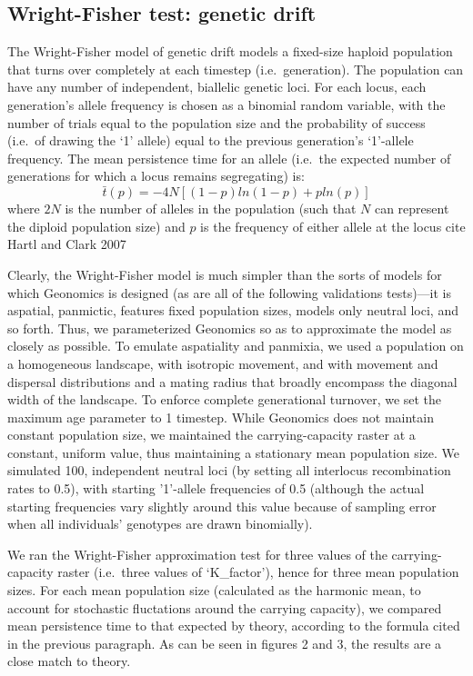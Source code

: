 ﻿\documentclass{article}
\begin{document}
\subsection{Wright-Fisher test: genetic drift}
The Wright-Fisher model of genetic drift models a fixed-size haploid population that
turns over completely at each timestep (i.e.\ generation).
The population can have any number of independent, biallelic genetic loci.
For each locus, each generation’s allele
frequency is chosen as a binomial random variable, with the number of trials equal to
the population size and the probability of success (i.e.\ of drawing the ‘1’ allele)
equal to the previous generation’s ‘1’-allele frequency.
The mean persistence time for an allele 
(i.e.\ the expected number of generations for which a locus remains segregating) 
is:
\begin{equation}
\bar{t}(p) = -4N[(1 - p)ln(1 - p) + pln(p)]
\end{equation}
where $2N$ is the number of alleles in the population (such that $N$ can
represent the diploid population size) and $p$ is the frequency of either allele
at the locus {\large cite Hartl and Clark 2007}

Clearly, the Wright-Fisher model is much simpler than the sorts of models for which
Geonomics is designed (as are all of the following validations tests)---it is aspatial,
panmictic, features fixed population sizes, models only neutral loci, and so forth. 
Thus, we parameterized Geonomics so as to approximate the model as closely as possible.
To emulate aspatiality and panmixia, we used a population on a homogeneous landscape,
with isotropic movement, and with movement and dispersal distributions
and a mating radius that broadly encompass the diagonal width of the landscape.
To enforce complete generational turnover, we set the
maximum age parameter to 1 timestep. While Geonomics does not maintain constant population
size, we maintained the carrying-capacity raster at a constant, uniform value, thus
maintaining a stationary mean population size. We simulated 100, independent neutral
loci (by setting all interlocus recombination rates to 0.5), with starting '1'-allele
frequencies of 0.5 (although the actual starting frequencies vary slightly around
this value because of sampling error when all individuals' genotypes are drawn binomially).

We ran the Wright-Fisher approximation test for three values of the
carrying-capacity raster (i.e.\ three values of `K\_factor'), hence for three mean
population sizes. For each mean population size (calculated as the harmonic mean,
to account for stochastic fluctations around the carrying capacity), we compared
mean persistence time to that
expected by theory, according to the formula cited in the previous paragraph. As can be
seen in figures 2 and 3, the results are a close match to theory.
\end{document}
